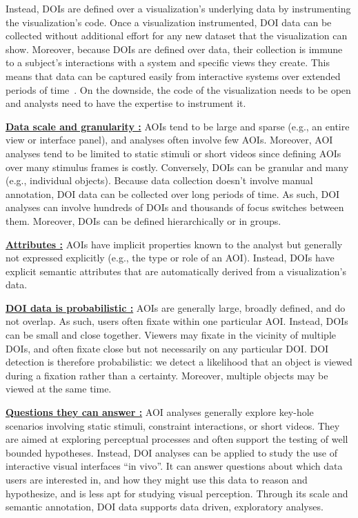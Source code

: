 Instead, DOIs are defined over a visualization's underlying data by instrumenting the visualization's code. Once a visualization instrumented, DOI data can be collected without additional effort for any new dataset that the visualization can show. Moreover, because DOIs are defined over data, their collection is immune to a subject's interactions with a system and specific views they create. This means that data can be captured easily from interactive systems over extended periods of time~\cite{alam15analyzing}. On the downside, the code of the visualization needs to be open and analysts need to have the expertise to instrument it.

\textbf{\underline{Data scale and granularity :}} AOIs tend to be large and sparse (e.g., an entire view or interface panel), and analyses often involve few AOIs. Moreover, AOI analyses tend to be limited to static stimuli or short videos since defining AOIs over many stimulus frames is costly. Conversely, DOIs can be granular and many (e.g., individual objects). Because data collection doesn't involve manual annotation, DOI data can be collected over long periods of time. As such, DOI analyses can involve hundreds of DOIs and thousands of focus switches between them. Moreover, DOIs can be defined hierarchically or in groups. 

\textbf{\uline{Attributes :}} AOIs have implicit properties known to the analyst but generally not expressed explicitly (e.g., the type or role of an AOI). Instead, DOIs have explicit semantic attributes that are automatically derived from a visualization's data. 

\textbf{\underline{DOI data is probabilistic :}} AOIs are generally large, broadly defined, and do not overlap. As such, users often fixate within one particular AOI. Instead, DOIs can be small and close together. Viewers may fixate in the vicinity of multiple DOIs, and often fixate close but not necessarily on any particular DOI. DOI detection is therefore probabilistic: we detect a likelihood that an object is viewed during a fixation rather than a certainty. Moreover, multiple objects may be viewed at the same time.

\textbf{\underline{Questions they can answer :}} AOI analyses generally explore key-hole scenarios involving static stimuli, constraint interactions, or short videos. They are aimed at exploring perceptual processes and often support the testing of well bounded hypotheses. Instead, DOI analyses can be applied to study the use of interactive visual interfaces ``in vivo''. It can answer questions about which data users are interested in, and how they might use this data to reason and hypothesize, and is less apt for studying visual perception. Through its scale and semantic annotation, DOI data supports data driven, exploratory analyses. 
 










